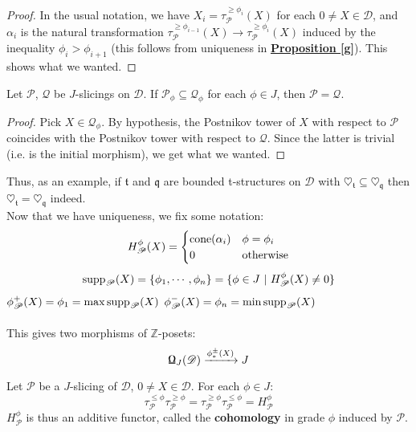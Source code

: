 \begin{proof}
In the usual notation, we have $X_i=\tau^{\ge \phi_i}_{\mathscr{P}}(X)$ for each $0 \not = X \in \mathscr{D}$, and $\alpha_i$ is the natural transformation $\tau^{\ge \phi_{i-1}}_{\mathscr{P}}(X) \longrightarrow \tau^{\ge \phi_i}_{\mathscr{P}}(X)$ induced by the inequality $\phi_i > \phi_{i+1}$ (this follows from uniqueness in \hyperref[g]{\textbf{Proposition \ref*{g}}}). This shows what we wanted.  
\end{proof}

\begin{prop}\label{fat}
Let $\mathscr{P}$, $\mathscr{Q}$ be $J$-slicings on $\mathscr{D}$. If $\mathscr{P}_{\phi} \subseteq \mathscr{Q}_{\phi}$ for each $\phi \in J$, then $\mathscr{P}=\mathscr{Q}$. 
\end{prop}

\begin{proof}
Pick $X \in \mathscr{Q}_{\phi}$. By hypothesis, the Postnikov tower of $X$ with respect to $\mathscr{P}$ coincides with the Postnikov tower with respect to $\mathscr{Q}$. Since the latter is trivial (i.e. is the initial morphism), we get what we wanted. 
\end{proof}

Thus, as an example, if $\mathfrak{t}$ and $\mathfrak{q}$ are bounded t-structures on $\mathscr{D}$ with $\heartsuit_{\mathfrak{t}} \subseteq \heartsuit_{\mathfrak{q}}$ then $\heartsuit_{\mathfrak{t}} = \heartsuit_{\mathfrak{q}}$ indeed. \\
 
Now that we have uniqueness, we fix some notation: $$H^{\phi}_{\mathscr{P}}(X)=\begin{cases} \textnormal{cone}(\alpha_i) & \phi=\phi_i \\ 0 & \textnormal{otherwise} \end{cases}$$
$$\textnormal{supp}_{\mathscr{P}}(X)=\{ \phi_1, \cdots , \phi_n \}= \{ \phi \in J \ | \ H^{\phi}_{\mathscr{P}}(X) \not = 0 \} $$
$\phi^+_{\mathscr{P}}(X)=\phi_1=\max \textnormal{supp}_{\mathscr{P}}(X)$ \hspace*{\fill} $\phi^-_{\mathscr{P}}(X)=\phi_n=\min \textnormal{supp}_{\mathscr{P}}(X)$ \\ \\
This gives two morphisms of $\mathbb{Z}$-posets: $$\textnormal{\Libra}_J(\mathscr{D}) \xrightarrow{\phi^{\pm}_*(X)} J$$

\begin{prop}
Let $\mathscr{P}$ be a $J$-slicing of $\mathscr{D}$, $0 \not = X \in \mathscr{D}$. For each $\phi \in J$: $$\tau^{\le \phi}_{\mathscr{P}}\tau^{\ge \phi}_{\mathscr{P}}=\tau^{\ge \phi}_{\mathscr{P}}\tau^{\le \phi}_{\mathscr{P}}=H^{\phi}_{\mathscr{P}}$$
$H^{\phi}_{\mathscr{P}}$ is thus an additive functor, called the \textbf{cohomology} in grade $\phi$ induced by $\mathscr{P}$. 
\end{prop}

